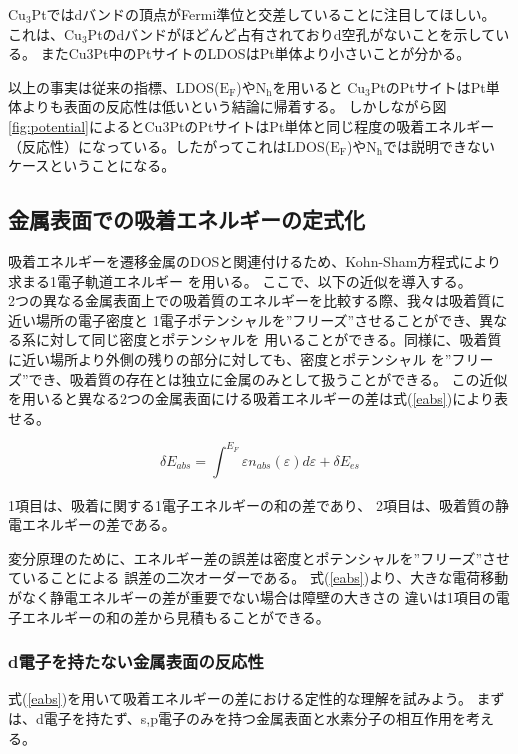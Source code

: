 \documentclass[12pt]{ltjsarticle}
\begin{document}
$\text{Cu}_\text{3}$Ptではdバンドの頂点がFermi準位と交差していることに注目してほしい。
これは、$\text{Cu}_\text{3}$Ptのdバンドがほどんど占有されておりd空孔がないことを示している。
またCu3Pt中のPtサイトのLDOSはPt単体より小さいことが分かる。

以上の事実は従来の指標、LDOS($\text{E}_\text{F}$)や$\text{N}_\text{h}$を用いると
$\text{Cu}_\text{3}$PtのPtサイトはPt単体よりも表面の反応性は低いという結論に帰着する。
しかしながら図\ref{fig:potential}によるとCu3PtのPtサイトはPt単体と同じ程度の吸着エネルギー
（反応性）になっている。したがってこれはLDOS($\text{E}_\text{F}$)や$\text{N}_\text{h}$では説明できない
ケースということになる。

\subsection{金属表面での吸着エネルギーの定式化}
吸着エネルギーを遷移金属のDOSと関連付けるため、Kohn-Sham方程式により求まる1電子軌道エネルギー
を用いる。
ここで、以下の近似を導入する。\\
2つの異なる金属表面上での吸着質のエネルギーを比較する際、我々は吸着質に近い場所の電子密度と
1電子ポテンシャルを”フリーズ”させることができ、異なる系に対して同じ密度とポテンシャルを
用いることができる。同様に、吸着質に近い場所より外側の残りの部分に対しても、密度とポテンシャル
を”フリーズ”でき、吸着質の存在とは独立に金属のみとして扱うことができる。
この近似を用いると異なる2つの金属表面にける吸着エネルギーの差は式(\ref{eabs})により表せる。

\begin{equation}
    \label{eabs}
    \delta E_{abs} = \int_{}^{E_F} \varepsilon n_{abs}(\varepsilon) d\varepsilon + 
    \delta E_{es}
\end{equation}

1項目は、吸着に関する1電子エネルギーの和の差であり、
2項目は、吸着質の静電エネルギーの差である。

変分原理のために、エネルギー差の誤差は密度とポテンシャルを”フリーズ”させていることによる
誤差の二次オーダーである。
式(\ref{eabs})より、大きな電荷移動がなく静電エネルギーの差が重要でない場合は障壁の大きさの
違いは1項目の電子エネルギーの和の差から見積もることができる。

\subsubsection{d電子を持たない金属表面の反応性}
式(\ref{eabs})を用いて吸着エネルギーの差における定性的な理解を試みよう。
まずは、d電子を持たず、s,p電子のみを持つ金属表面と水素分子の相互作用を考える。
\end{document}
